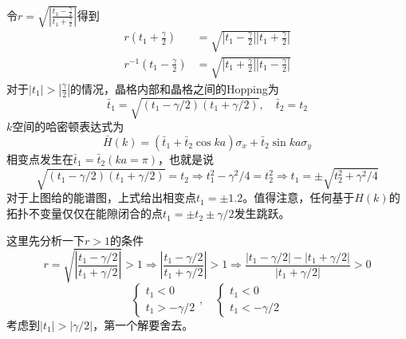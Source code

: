 \documentclass{article}
\begin{document}
令$r=\sqrt{|\frac{t_1-\frac{\gamma}{2}}{t_1+\frac{\gamma}{2}}|}$得到
\begin{equation}
    \begin{split}
        r(t_1+\frac{\gamma}{2})&=\sqrt{|t_1-\frac{\gamma}{2}||t_1+\frac{\gamma}{2}|}\\
        r^{-1}(t_1-\frac{\gamma}{2})&=\sqrt{|t_1+\frac{\gamma}{2}||t_1-\frac{\gamma}{2}|}
    \end{split}
\end{equation}
对于$|t_1|>|\frac{\gamma}{2}|$的情况，晶格内部和晶格之间的Hopping为
\begin{equation}
    \bar{t}_1=\sqrt{(t_1-\gamma/2)(t_1+\gamma/2)},\quad \bar{t}_2=t_2
\end{equation}
$k$空间的哈密顿表达式为
\begin{equation}
    \bar{H}(k)=(\bar{t}_1+\bar{t}_2\cos ka)\sigma_x+\bar{t}_2\sin ka\sigma_y
\end{equation}
相变点发生在$\bar{t}_1=\bar{t}_2(ka=\pi)$，也就是说
\begin{equation}
    \sqrt{(t_1-\gamma/2)(t_1+\gamma/2)}=t_2\Rightarrow t_1^2-\gamma^2/4=t_2^2\Rightarrow t_1=\pm\sqrt{t_2^2+\gamma^2/4}
\end{equation}
对于上图给的能谱图，上式给出相变点$t_1=\pm 1.2$。值得注意，任何基于$H(k)$的拓扑不变量仅仅在能隙闭合的点$t_1=\pm t_2\pm\gamma/2$发生跳跃。

这里先分析一下$r>1$的条件
\begin{equation}
    r=\sqrt{|\frac{t_1-\gamma/2}{t_1+\gamma/2}|}>1\Rightarrow|\frac{t_1-\gamma/2}{t_1+\gamma/2}|>1\Rightarrow\frac{|t_1-\gamma/2|-|t_1+\gamma/2|}{|t_1+\gamma/2|}>0
\end{equation}
\begin{equation}
    \begin{cases}
        t_1<0\\
        t_1>-\gamma/2
    \end{cases},\quad\begin{cases}
        t_1<0\\
        t_1<-\gamma/2
    \end{cases}
\end{equation}
考虑到$|t_1|>|\gamma/2|$，第一个解要舍去。
\end{document}
